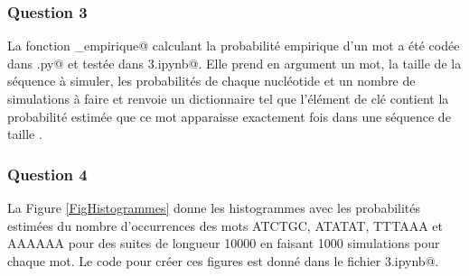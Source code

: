 \documentclass[a4paper,12pt]{article}
\begin{document}
\subsubsection*{Question 3}

La fonction \verb@proba_empirique@ calculant la probabilité empirique d'un mot a été codée dans \verb@projet.py@ et testée dans \verb@Projet3.ipynb@. Elle prend en argument un mot, la taille \verb@lg@ de la séquence à simuler, les probabilités de chaque nucléotide et un nombre de simulations à faire et renvoie un dictionnaire tel que l'élément de clé \verb@i@ contient la probabilité estimée que ce mot apparaisse exactement \verb@i@ fois dans une séquence de taille \verb@lg@.

\subsubsection*{Question 4}

La Figure \ref{FigHistogrammes} donne les histogrammes avec les probabilités estimées du nombre d'occurrences des mots ATCTGC, ATATAT, TTTAAA et AAAAAA pour des suites de longueur 10000 en faisant 1000 simulations pour chaque mot. Le code pour créer ces figures est donné dans le fichier \verb@Projet3.ipynb@.
\end{document}
